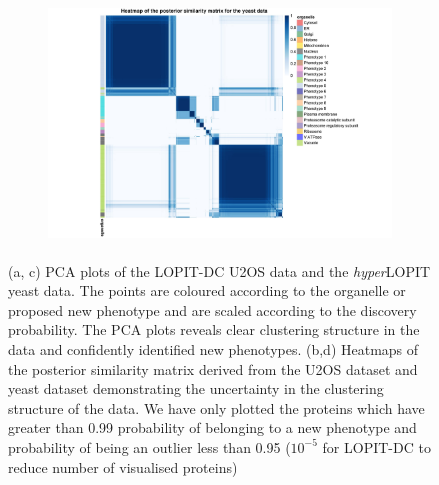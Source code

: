 \documentclass[12pt,english]{article}
\begin{document}
\begin{figure}
\begin{subfigure}[t]{0.5\textwidth}
	\centering
	\includegraphics[height=2.5in]{heatmapYeast.jpg}
	\caption{}
\end{subfigure}
\caption{(a, c) PCA plots of the LOPIT-DC U2OS data and the \textit{hyper}LOPIT yeast data. The points are coloured according to the organelle or proposed new phenotype and are scaled according to the discovery probability. The PCA plots reveals clear clustering structure in the data and confidently identified new phenotypes. (b,d) Heatmaps of the posterior similarity matrix derived from the U2OS dataset and yeast dataset demonstrating the uncertainty in the clustering structure of the data. We have only plotted the proteins which have greater than 0.99 probability of belonging to a new phenotype and probability of being an outlier less than 0.95 ($10^{-5}$ for LOPIT-DC to reduce number of visualised proteins)}
 \label{figure:DC}
\end{figure}
\end{document}
